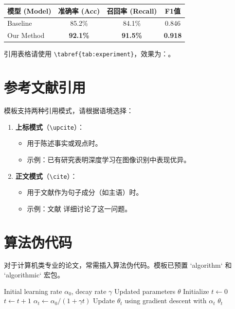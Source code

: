 \begin{table}[H]
  \centering
  \begin{tabular}{l c c c}
    \toprule
    模型 (Model) & 准确率 (Acc) & 召回率 (Recall) & F1值 \\
    \midrule
    Baseline & 85.2\% & 84.1\% & 0.846 \\
    Our Method & \textbf{92.1\%} & \textbf{91.5\%} & \textbf{0.918} \\
    \bottomrule
  \end{tabular}
\end{table}

引用表格请使用 \verb|\tabref{tab:experiment}|，效果为：。

\section{参考文献引用}

模板支持两种引用模式，请根据语境选择：

\begin{enumerate}
    \item \textbf{上标模式}（\verb|\upcite|）：
    \begin{itemize}
      \item 用于陈述事实或观点时。
      \item 示例：已有研究表明深度学习在图像识别中表现优异。
    \end{itemize}

    \item \textbf{正文模式}（\verb|\cite|）：
    \begin{itemize}
      \item 用于文献作为句子成分（如主语）时。
      \item 示例：文献 \cite{guo_2023_research} 详细讨论了这一问题。
    \end{itemize}
\end{enumerate}

\section{算法伪代码}

对于计算机类专业的论文，常需插入算法伪代码。模板已预置 `algorithm` 和 `algorithmic` 宏包。

\begin{algorithm}[H]
  \caption{自适应学习率调整算法}
  \label{alg:learning_rate}
  \begin{algorithmic}[1]
    \REQUIRE Initial learning rate $\alpha_0$, decay rate $\gamma$
    \ENSURE Updated parameters $\theta$
    \STATE Initialize $t \leftarrow 0$
    \STATE $t \leftarrow t + 1$
    \STATE $\alpha_t \leftarrow \alpha_0 / (1 + \gamma t)$
    \STATE Update $\theta_t$ using gradient descent with $\alpha_t$
    \ENDWHILE
    \RETURN $\theta_t$
  \end{algorithmic}
\end{algorithm}

